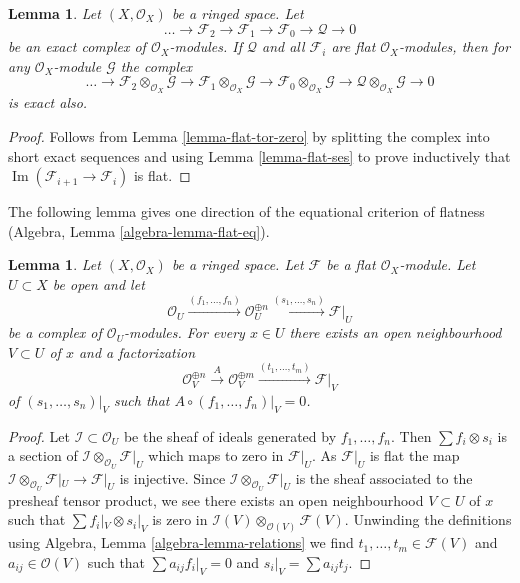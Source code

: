 \documentclass{stacks-project}
\theoremstyle{plain}
\newtheorem{lemma}[subsection]{Lemma}
\theoremstyle{definition}
\theoremstyle{remark}
\numberwithin{equation}{subsection}
\def\Im{\mathop{\mathrm{Im}}}
\begin{document}
\begin{lemma}
\label{lemma-flat-resolution-of-flat}
Let $(X, \mathcal{O}_X)$ be a ringed space.
Let
$$
\ldots \to
\mathcal{F}_2 \to
\mathcal{F}_1 \to
\mathcal{F}_0 \to
\mathcal{Q} \to 0
$$
be an exact complex of $\mathcal{O}_X$-modules.
If $\mathcal{Q}$ and all $\mathcal{F}_i$ are flat $\mathcal{O}_X$-modules,
then for any $\mathcal{O}_X$-module $\mathcal{G}$ the complex
$$
\ldots \to
\mathcal{F}_2 \otimes_{\mathcal{O}_X} \mathcal{G} \to
\mathcal{F}_1 \otimes_{\mathcal{O}_X} \mathcal{G} \to
\mathcal{F}_0 \otimes_{\mathcal{O}_X} \mathcal{G} \to
\mathcal{Q} \otimes_{\mathcal{O}_X} \mathcal{G} \to 0
$$
is exact also.
\end{lemma}

\begin{proof}
Follows from Lemma \ref{lemma-flat-tor-zero} by splitting the complex
into short exact sequences and using Lemma \ref{lemma-flat-ses} to
prove inductively that $\Im(\mathcal{F}_{i + 1} \to \mathcal{F}_i)$
is flat.
\end{proof}

\noindent
The following lemma gives one direction of the equational criterion of
flatness (Algebra, Lemma \ref{algebra-lemma-flat-eq}).

\begin{lemma}
\label{lemma-flat-eq}
Let $(X, \mathcal{O}_X)$ be a ringed space. Let $\mathcal{F}$ be a flat
$\mathcal{O}_X$-module. Let $U \subset X$ be open and let
$$
\mathcal{O}_U \xrightarrow{(f_1, \ldots, f_n)}
\mathcal{O}_U^{\oplus n} \xrightarrow{(s_1, \ldots, s_n)}
\mathcal{F}|_U
$$
be a complex of $\mathcal{O}_U$-modules. For every $x \in U$ there
exists an open neighbourhood $V \subset U$ of $x$ and a factorization
$$
\mathcal{O}_V^{\oplus n}
\xrightarrow{A}
\mathcal{O}_V^{\oplus m} \xrightarrow{(t_1, \ldots, t_m)}
\mathcal{F}|_V
$$
of $(s_1, \ldots, s_n)|_V$ such that $A \circ (f_1, \ldots, f_n)|_V = 0$.
\end{lemma}

\begin{proof}
Let $\mathcal{I} \subset \mathcal{O}_U$ be the sheaf of ideals
generated by $f_1, \ldots, f_n$. Then $\sum f_i \otimes s_i$ is
a section of $\mathcal{I} \otimes_{\mathcal{O}_U} \mathcal{F}|_U$
which maps to zero in $\mathcal{F}|_U$. As $\mathcal{F}|_U$ is flat
the map
$\mathcal{I} \otimes_{\mathcal{O}_U} \mathcal{F}|_U \to \mathcal{F}|_U$
is injective. Since $\mathcal{I} \otimes_{\mathcal{O}_U} \mathcal{F}|_U$
is the sheaf associated to the presheaf tensor product, we see
there exists an open neighbourhood $V \subset U$ of $x$ such
that $\sum f_i|_V \otimes s_i|_V$ is zero in
$\mathcal{I}(V) \otimes_{\mathcal{O}(V)} \mathcal{F}(V)$.
Unwinding the definitions using Algebra, Lemma \ref{algebra-lemma-relations}
we find $t_1, \ldots, t_m \in \mathcal{F}(V)$ and $a_{ij} \in \mathcal{O}(V)$
such that $\sum a_{ij}f_i|_V = 0$ and $s_i|_V = \sum a_{ij}t_j$.
\end{proof}
\end{document}
